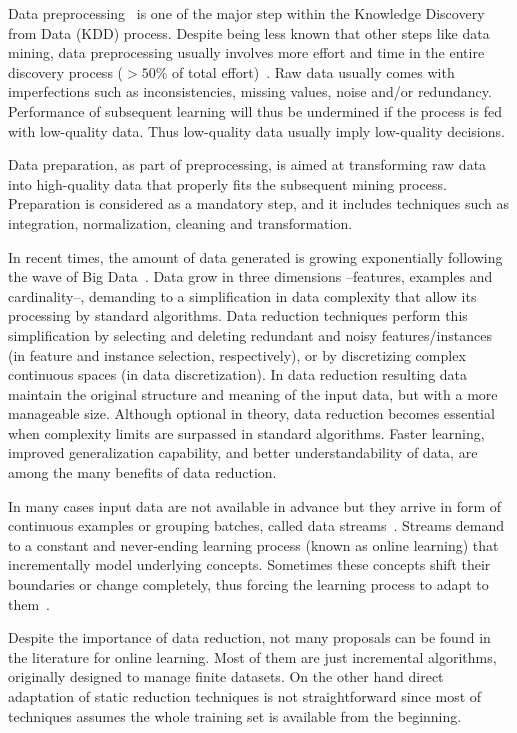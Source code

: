 \documentclass[preprint,12pt]{elsarticle}
\begin{document}
Data preprocessing~\cite{garcia14} is one of the major step within the Knowledge Discovery from Data (KDD) process. Despite being less known that other steps like data mining, data preprocessing usually involves more effort and time in the entire discovery process ($> 50\%$ of total effort)~\cite{pyle99}. Raw data usually comes with imperfections such as inconsistencies, missing values, noise and/or redundancy. Performance of subsequent learning will thus be undermined if the process is fed with low-quality data. Thus low-quality data usually imply low-quality decisions.

Data preparation, as part of preprocessing, is aimed at transforming raw data into high-quality data that properly fits the subsequent mining process. Preparation is considered as a mandatory step, and it includes techniques such as integration, normalization, cleaning and transformation.

In recent times, the amount of data generated is growing exponentially following the wave of Big Data~\cite{mayer13}. Data grow in three dimensions --features, examples and cardinality--, demanding to a simplification in data complexity that allow its processing by standard algorithms. Data reduction techniques perform this simplification by selecting and deleting redundant and noisy features/instances (in feature and instance selection, respectively), or by discretizing complex continuous spaces (in data discretization). In data reduction resulting data maintain the original structure and meaning of the input data, but with a more manageable size. Although optional in theory, data reduction becomes essential when complexity limits are surpassed in standard algorithms. Faster learning, improved generalization capability, and better understandability of data, are among the many benefits of data reduction. 

In many cases input data are not available in advance but they arrive in form of continuous examples or grouping batches, called data streams~\cite{gama10}. Streams demand to a constant and never-ending learning process (known as online learning) that incrementally model underlying concepts. Sometimes these concepts shift their boundaries or change completely, thus forcing the learning process to adapt to them~\cite{gama14}.

Despite the importance of data reduction, not many proposals can be found in the literature for online learning. Most of them are just incremental algorithms, originally designed to manage finite datasets. On the other hand direct adaptation of static reduction techniques is not straightforward since most of techniques assumes the whole training set is available from the beginning. 
\end{document}
